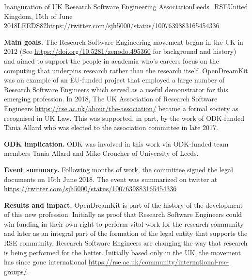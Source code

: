 \begin{event}{Inauguration of UK Research Software Engineering Association}{Leeds_RSE}{United Kingdom, 15th of June 2018}{LEEDS}{8}{2}{https://twitter.com/sjh5000/status/1007639883165454336}

\textbf{Main goals.} The Research Software Engineering movement began in the UK in 2012 (See \url{https://doi.org/10.5281/zenodo.495360} for background and history) and aimed to support the people in academia who's careers focus on the computing that underpins research rather than the research itself. OpenDreamKit was an example of an EU-funded project that employed a large number of Research Software Engineers which served as a useful demonstrator for this emerging profession. In 2018, The UK Association of Research Software Engineers \url{https://rse.ac.uk/about/the-association/} became a formal society as recognised in UK Law. This was supported, in part, by the work of ODK-funded Tania Allard who was elected to the association committee in late 2017.

\textbf{ODK implication.} ODK was involved in this work via ODK-funded team members Tania Allard and Mike Croucher of University of Leeds.

\textbf{Event summary.} Following months of work, the committee signed the legal documents on 15th June 2018. The event was summarized on twitter at \url{https://twitter.com/sjh5000/status/1007639883165454336}

\textbf{Results and impact.} OpenDreamKit is part of the history of the development of this new profession. Initially as proof that Research Software Engineers could win funding in their own right to perform vital work for the research community and later as an integral part of the formation of the legal entity that supports the RSE community.  Research Software Engineers are changing the way that research is being performed for the better. Initially based only in the UK, the movement has since gone international \url{https://rse.ac.uk/community/international-rse-groups/}.

\end{event}
